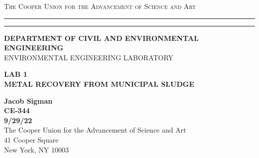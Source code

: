 \begin{titlepage}
    \begin{center}
    {{\Large{\textsc{The Cooper Union for the Advancement of Science and Art}}}} \rule[0.1cm]{15.8cm}{0.1mm}
    \rule[0.5cm]{15.8cm}{0.6mm}
    {\small{\bf DEPARTMENT OF CIVIL AND ENVIRONMENTAL ENGINEERING}}\\
    {\footnotesize{ENVIRONMENTAL ENGINEERING LABORATORY}}
    \end{center}
    \vspace{15mm}
    \begin{center}
    {\large{\bf LAB 1\\}}
    \vspace{5mm}
    {\Large{\bf METAL RECOVERY FROM MUNICIPAL SLUDGE}}
    \end{center}
    \vspace{35mm}
    \par
    \noindent
    \hfill
    \vspace{60mm}
    \begin{center}
    {\large{\bf Jacob Sigman \\ CE-344 \\ 9/29/22 \\}}
    \vspace{20mm}
    {\normalsize{The Cooper Union for the Advancement of Science and Art \\ 41 Cooper Square\\
    New York, NY 10003}}
    \end{center}
\end{titlepage}